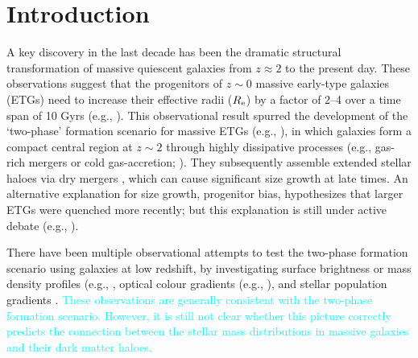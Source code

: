 \documentclass[a4paper,fleqn,usenatbib]{mnras}
\newcommand{\song}[1]{\textcolor{cyan}{#1}}
\begin{document}



\section{Introduction}
    \label{sec:intro}
    
    A key discovery in the last decade has been the dramatic structural transformation 
    of massive quiescent galaxies \citep[e.g.,][]{Trujillo2006, vanDokkum2008, 
    Cimatti2008, Damjanov2009, vanderWel2011, Szomoru2012, Patel2013} from 
    $z \approx 2$ to the present day. 
    These observations suggest that the progenitors of $z{\sim} 0$ massive early-type 
    galaxies (ETGs) need to increase their effective radii ($R_{\rm e}$) by a factor 
    of 2--4 over a time span of 10 Gyrs (e.g., \citealt{Newman2012, vdWel2014}). 
    This observational result spurred the development of the `two-phase' formation
    scenario for massive ETGs (e.g., \citealt{Oser2010, Oser2012}),
    in which galaxies form a compact central region at $z\sim 2$ through highly 
    dissipative processes (e.g., gas-rich mergers or cold gas-accretion;
    \citealt{Hopkins2008, Dekel2009}). 
    They subsequently assemble extended stellar haloes via dry mergers 
    \citep[e.g.,][]{Naab2006, Khochfar2006, Oser2010, Oser2012}, which can cause 
    significant size growth at late times. 
    An alternative explanation for size growth, progenitor bias, hypothesizes that 
    larger ETGs were quenched more recently; but this explanation is still under 
    active debate (e.g., \citealt{Newman2012, Carollo2013, Poggianti2013, Belli2015,
    Keating2015, Fagioli2016}). 
    
    There have been multiple observational attempts to test the two-phase 
    formation scenario using galaxies at low redshift, by investigating surface 
    brightness or mass density profiles (e.g., \citealt{Huang2013a, Huang2013b, 
    Oh2017}, optical colour gradients (e.g., \citealt{LaBarbera2010, LaBarbera2012}), 
    and stellar population gradients \citep[e.g.,][]{Coccato2010, Coccato2011, 
    Greene2015, Barbosa2016}. 
    \song{
    These observations are generally consistent with the two-phase formation scenario. 
    However, it is still not clear whether this picture correctly 
    predicts the connection between the stellar mass distributions in massive galaxies 
    and their dark matter haloes.}
    
\end{document}
